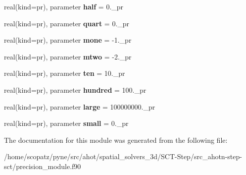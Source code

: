 \begin{DoxyCompactItemize}
\item 
\hypertarget{classprecision__module_a2975299bd4cad0c5fc29b217c7a3c55a}{real(kind=pr), parameter {\bfseries half} = 0.\-\_\-pr}\label{classprecision__module_a2975299bd4cad0c5fc29b217c7a3c55a}

\item 
\hypertarget{classprecision__module_a0517b994d0f7952d498a1242fb834718}{real(kind=pr), parameter {\bfseries quart} = 0.\-\_\-pr}\label{classprecision__module_a0517b994d0f7952d498a1242fb834718}

\item 
\hypertarget{classprecision__module_aa814d5147dc4064661bf0010f9ee044f}{real(kind=pr), parameter {\bfseries mone} = -\/1.\-\_\-pr}\label{classprecision__module_aa814d5147dc4064661bf0010f9ee044f}

\item 
\hypertarget{classprecision__module_ab2bbff5634ef6e43b944fa5dbaa013c3}{real(kind=pr), parameter {\bfseries mtwo} = -\/2.\-\_\-pr}\label{classprecision__module_ab2bbff5634ef6e43b944fa5dbaa013c3}

\item 
\hypertarget{classprecision__module_a8c8a6d6ed3f94ec0e37884f3f2b3700c}{real(kind=pr), parameter {\bfseries ten} = 10.\-\_\-pr}\label{classprecision__module_a8c8a6d6ed3f94ec0e37884f3f2b3700c}

\item 
\hypertarget{classprecision__module_a391d84726af18dbfd50c69c1292499ab}{real(kind=pr), parameter {\bfseries hundred} = 100.\-\_\-pr}\label{classprecision__module_a391d84726af18dbfd50c69c1292499ab}

\item 
\hypertarget{classprecision__module_af2e8673d0687c8aec5af0efa8b6d4060}{real(kind=pr), parameter {\bfseries large} = 100000000.\-\_\-pr}\label{classprecision__module_af2e8673d0687c8aec5af0efa8b6d4060}

\item 
\hypertarget{classprecision__module_ae2f943dd65cbd67271dcbd024d72b834}{real(kind=pr), parameter {\bfseries small} = 0.\-\_\-pr}\label{classprecision__module_ae2f943dd65cbd67271dcbd024d72b834}

\end{DoxyCompactItemize}


The documentation for this module was generated from the following file\-:\begin{DoxyCompactItemize}
\item 
/home/scopatz/pyne/src/ahot/spatial\-\_\-solvers\-\_\-3d/\-S\-C\-T-\/\-Step/src\-\_\-ahotn-\/step-\/sct/precision\-\_\-module.\-f90\end{DoxyCompactItemize}
